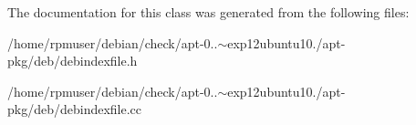 \-The documentation for this class was generated from the following files\-:\begin{DoxyCompactItemize}
\item 
/home/rpmuser/debian/check/apt-\/0..$\sim$exp12ubuntu10./apt-\/pkg/deb/debindexfile.\-h\item 
/home/rpmuser/debian/check/apt-\/0..$\sim$exp12ubuntu10./apt-\/pkg/deb/debindexfile.\-cc\end{DoxyCompactItemize}
